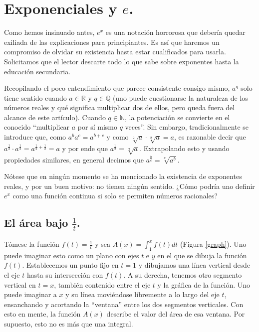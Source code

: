 \section{Exponenciales y $e$.}

Como hemos insinuado antes, $e^x$ es una notación horrorosa que debería quedar exiliada de las explicaciones para principiantes. Es así que haremos un compromiso de olvidar su existencia hasta estar cualificados para usarla. Solicitamos que el lector descarte todo lo que sabe sobre exponentes hasta la educación secundaria.

Recopilando el poco entendimiento que parece consistente consigo mismo, $a^q$ solo tiene sentido cuando $a\in \mathbb{R}$ y $q \in \mathbb{Q}$ (uno puede cuestionarse la naturaleza de los números reales y qué significa multiplicar dos de ellos, pero queda fuera del alcance de este artículo). Cuando $q \in \mathbb{N}$, la potenciación se convierte en el conocido \enquote{multiplicar $a$ por sí mismo $q$ veces}. Sin embargo, tradicionalmente se introduce que, como $a^b a^c = a^{b + c}$ y como $\sqrt[2]{a} \cdot \sqrt[2]{a} = a$, es razonable decir que $a^{\frac{1}{2}}\cdot a^{\frac{1}{2}} = a^{\frac{1}{2} + \frac{1}{2}} = a$ y por ende que $a^{\frac{1}{2}} = \sqrt[2]{a}$. Extrapolando esto y usando propiedades similares, en general decimos que $a^{\frac{b}{c}} = \sqrt[c]{a^b}$.

Nótese que en ningún momento se ha mencionado la existencia de exponentes reales, y por un buen motivo: no tienen ningún sentido. ¿Cómo podría uno definir $e^x$ como una función continua si solo se permiten números racionales?

\subsection{El área bajo $\frac{1}{t}$.}

Tómese la función $f(t) = \frac{1}{t}$ y sea $A(x) = \int_1^x f(t) dt$ (Figura \ref{graph}). Uno puede imaginar esto como un plano con ejes $t$ e $y$ en el que se dibuja la función $f(t)$. Establecemos un punto fijo en $t = 1$ y dibujamos una línea vertical desde el eje $t$ hasta su intersección con $f(t)$. A su derecha, tenemos otro segmento vertical en $t = x$, también contenido entre el eje $t$ y la gráfica de la función. Uno puede imaginar a $x$ y su línea moviéndose libremente a lo largo del eje $t$, ensanchando y acortando la \enquote{ventana} entre los dos segmentos verticales. Con esto en mente, la función $A(x)$ describe el valor del área de esa ventana. Por supuesto, esto no es más que una integral.

